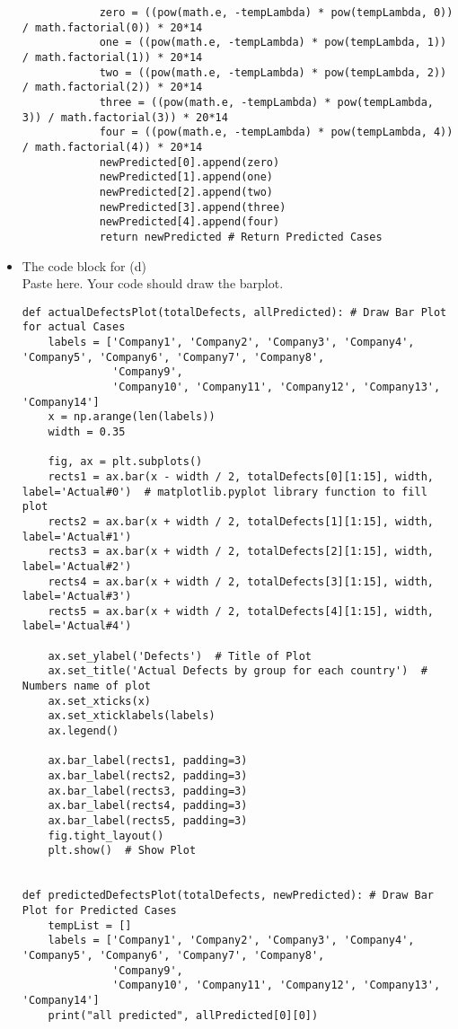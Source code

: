 \documentclass[a4 paper]{article}
\numberwithin{equation}{section}
\newcommand{\0}{\mathbf{0}}
\begin{document}
\begin{itemize}
\begin{lstlisting}
            zero = ((pow(math.e, -tempLambda) * pow(tempLambda, 0)) / math.factorial(0)) * 20*14
            one = ((pow(math.e, -tempLambda) * pow(tempLambda, 1)) / math.factorial(1)) * 20*14
            two = ((pow(math.e, -tempLambda) * pow(tempLambda, 2)) / math.factorial(2)) * 20*14
            three = ((pow(math.e, -tempLambda) * pow(tempLambda, 3)) / math.factorial(3)) * 20*14
            four = ((pow(math.e, -tempLambda) * pow(tempLambda, 4)) / math.factorial(4)) * 20*14
            newPredicted[0].append(zero)
            newPredicted[1].append(one)
            newPredicted[2].append(two)
            newPredicted[3].append(three)
            newPredicted[4].append(four)
            return newPredicted # Return Predicted Cases
        \end{lstlisting}
		\item The code block for (d)\\
		Paste here. Your code should draw the barplot.
		\begin{lstlisting}
def actualDefectsPlot(totalDefects, allPredicted): # Draw Bar Plot for actual Cases
    labels = ['Company1', 'Company2', 'Company3', 'Company4', 'Company5', 'Company6', 'Company7', 'Company8',
              'Company9',
              'Company10', 'Company11', 'Company12', 'Company13', 'Company14']
    x = np.arange(len(labels))
    width = 0.35

    fig, ax = plt.subplots()
    rects1 = ax.bar(x - width / 2, totalDefects[0][1:15], width, label='Actual#0')  # matplotlib.pyplot library function to fill plot
    rects2 = ax.bar(x + width / 2, totalDefects[1][1:15], width, label='Actual#1')
    rects3 = ax.bar(x + width / 2, totalDefects[2][1:15], width, label='Actual#2')
    rects4 = ax.bar(x + width / 2, totalDefects[3][1:15], width, label='Actual#3')
    rects5 = ax.bar(x + width / 2, totalDefects[4][1:15], width, label='Actual#4')

    ax.set_ylabel('Defects')  # Title of Plot
    ax.set_title('Actual Defects by group for each country')  # Numbers name of plot
    ax.set_xticks(x)
    ax.set_xticklabels(labels)
    ax.legend()

    ax.bar_label(rects1, padding=3)
    ax.bar_label(rects2, padding=3)
    ax.bar_label(rects3, padding=3)
    ax.bar_label(rects4, padding=3)
    ax.bar_label(rects5, padding=3)
    fig.tight_layout()
    plt.show()  # Show Plot


def predictedDefectsPlot(totalDefects, newPredicted): # Draw Bar Plot for Predicted Cases
    tempList = []
    labels = ['Company1', 'Company2', 'Company3', 'Company4', 'Company5', 'Company6', 'Company7', 'Company8',
              'Company9',
              'Company10', 'Company11', 'Company12', 'Company13', 'Company14']
    print("all predicted", allPredicted[0][0])


\end{lstlisting}
\end{itemize}
\end{document}
